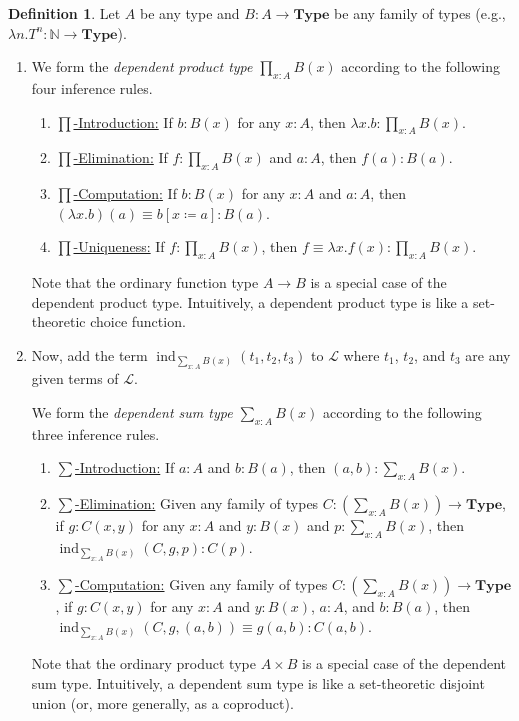 \documentclass[10pt,letterpaper,cm]{nupset}
\theoremstyle{definition}
\newtheorem{definition}{Definition}[subsection]
\theoremstyle{theorem}
\theoremstyle{remark}
\newcommand{\N}{\mathbb N}
\newcommand{\1}{\mathbf{1}}
\newcommand{\0}{\vec 0}
\DeclareMathOperator{\ind}{ind}
\begin{document}
\begin{definition} Let $A$ be any type and $B : A \to \mathbf{Type}$ be any family of types (e.g., $\lambda n.T^n : \N \to \mathbf{Type}$).  
\begin{enumerate}
\item We form the \textit{dependent product type $\prod_{x:A} B(x)$} according to the following four inference rules.
\begin{enumerate}
\item \underline{${\prod}$-Introduction:} If $ b: B(x)$ for any $x: A$, then $\lambda x. b : \prod_{x : A} B(x)$.
\item \underline{${\prod}$-Elimination:} If $f:  \prod_{x : A} B(x)$ and $a: A$, then $f(a) : B(a)$.
\item \underline{${\prod}$-Computation:} If $ b: B(x)$ for any $x : A$ and $a: A$, then $(\lambda x.b)(a) \equiv b[x\coloneqq a]: B(a)$.
\item \underline{${\prod}$-Uniqueness:} If $f: \prod_{x:A} B(x)$, then $f \equiv \lambda x. f(x) : \prod_{x:A} B(x)$.
\end{enumerate}
Note that the ordinary function type $A \to B$ is a special case of the dependent product type. Intuitively, a dependent product type is like a set-theoretic choice function. 
\item Now, add the term $\ind_{\sum_{x:A}B(x)}(t_1, t_2, t_3)$ to $\mathcal{L}$ where $t_1$, $t_2$, and $t_3$ are any given terms of $\mathcal{L}$. 

We form the \textit{dependent sum type $\sum_{x:A} B(x)$} according to the following three inference rules.
\begin{enumerate}
\item \underline{${\sum}$-Introduction:} If $a: A$ and $b: B(a)$, then $(a, b) : \sum_{x: A} B(x)$.
\item \underline{${\sum}$-Elimination:} Given any family of types $C: \left(\sum_{x:A} B(x)\right) \to \mathbf{Type}$, if $g: C(x,y)$ for any $x: A$ and $y: B(x)$ and $p: \sum_{x:A}B(x)$, then $\ind_{\sum_{x:A}B(x)}(C, g, p) : C(p)$.
\item \underline{${\sum}$-Computation:}  Given any family of types $C: \left(\sum_{x:A} B(x)\right) \to \mathbf{Type}$, if $g: C(x,y)$ for any $x: A$ and $y: B(x)$, $a: A$, and $b: B(a)$, then $\ind_{\sum_{x:A}B(x)}(C, g, (a,b)) \equiv g(a,b) : C(a,b)$.
\end{enumerate}
Note that the ordinary product type $A  \times B$ is a special case of the dependent sum type. Intuitively, a dependent sum type is like a set-theoretic disjoint union (or, more generally, as a coproduct).
\end{enumerate}
\end{definition}
\end{document}
